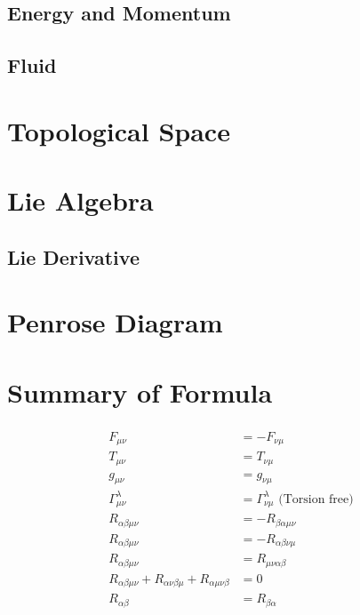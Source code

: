 \documentclass[12pt]{article}
\theoremstyle{mystyle}{\newtheorem{definition}{Definition}[section]}
\theoremstyle{mystyle}{\newtheorem{theorem}[definition]{Theorem}}
\theoremstyle{mystyle}{\newtheorem*{remark}{Remark}}
\theoremstyle{mystyle}{\newtheorem*{example}{Example}}
\theoremstyle{mystyle}{\newtheorem*{examples}{Examples}}
\theoremstyle{cstyle}{\newtheorem*{cthm}{}}
\begin{document}
\subsection{Energy and Momentum}
\subsection{Fluid}


\section{Topological Space}

\section{Lie Algebra}

\subsection{Lie Derivative}

\section{Penrose Diagram}
\section{Summary of Formula}
\begin{align*}
  \begin{split}
    F_{\mu\nu} &= - F_{\nu\mu}\\
    T_{\mu\nu} &= T_{\nu\mu}\\
    g_{\mu\nu} &= g_{\nu\mu}\\
    \Gamma ^{\lambda}_{\mu\nu} &= \Gamma^{\lambda}_{\nu\mu} \text{ (Torsion free)}\\
    R_{\alpha\beta\mu\nu} &= -R_{\beta\alpha\mu\nu}\\
    R_{\alpha\beta\mu\nu} &= -R_{\alpha\beta\nu\mu}\\
    R_{\alpha\beta\mu\nu} &= R_{\mu\nu\alpha\beta}\\
    R_{\alpha\beta\mu\nu} + R_{\alpha\nu\beta\mu} + R_{\alpha\mu\nu\beta} &= 0 \\
    R_{\alpha\beta} &= R_{\beta\alpha}
  \end{split}
\end{align*}
\end{document}
